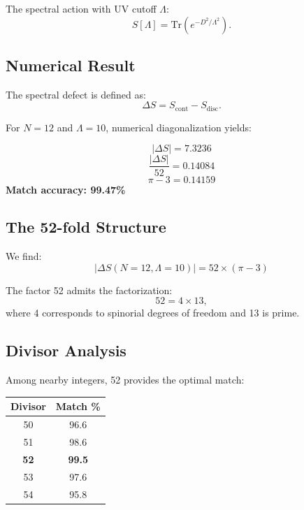 \documentclass[12pt, a4paper]{article}
\begin{document}
The spectral action with UV cutoff $\Lambda$:
\begin{equation}
    S[\Lambda] = \mathrm{Tr}\left( e^{-D^2/\Lambda^2} \right).
\end{equation}

\subsection{Numerical Result}

The spectral defect is defined as:
\begin{equation}
    \Delta S = S_{\text{cont}} - S_{\text{disc}}.
\end{equation}

For $N = 12$ and $\Lambda = 10$, numerical diagonalization yields:

\begin{tcolorbox}[colback=yellow!10!white, colframe=orange!75!black, title=Key Numerical Result]
\begin{equation}
    |\Delta S| = 7.3236
\end{equation}
\begin{equation}
    \frac{|\Delta S|}{52} = 0.14084
\end{equation}
\begin{equation}
    \pi - 3 = 0.14159
\end{equation}
\textbf{Match accuracy: 99.47\%}
\end{tcolorbox}

\subsection{The 52-fold Structure}

We find:
\begin{equation}
    \boxed{|\Delta S(N=12, \Lambda=10)| = 52 \times (\pi - 3)}
\end{equation}

The factor 52 admits the factorization:
\begin{equation}
    52 = 4 \times 13,
\end{equation}
where 4 corresponds to spinorial degrees of freedom and 13 is prime.

\subsection{Divisor Analysis}

Among nearby integers, 52 provides the optimal match:

\begin{center}
\begin{tabular}{cc}
\toprule
Divisor & Match \% \\
\midrule
50 & 96.6 \\
51 & 98.6 \\
\textbf{52} & \textbf{99.5} \\
53 & 97.6 \\
54 & 95.8 \\
\bottomrule
\end{tabular}
\end{center}
\end{document}
